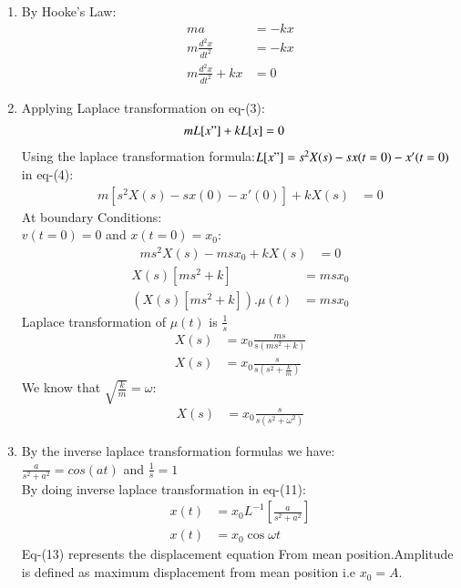\documentclass[journal,12pt,twocolumn]{IEEEtran}
\theoremstyle{remark}
\begin{document}
\begin{enumerate}
\\
\item{}
By Hooke's Law:
\begin{align}
    ma&=-kx\\
    m\frac{d^2x}{dt^2}&=-kx\\
    m\frac{d^2x}{dt^2}+kx&=0
\end{align}
\item{}
 Applying Laplace transformation on eq-(3):
\begin{align}
    mL[x"]+kL[x]&=0
    \end{align}
 Using the laplace transformation formula:$L[x"]=s^2X(s)-sx(t=0)-x'(t=0)$ in eq-(4):
 \begin{align}
m[s^2X(s)-sx(0)-x'(0)]+kX(s)&=0
\end{align}
At boundary Conditions:\\$v(t=0)=0$  and $x(t=0)=x_0$:
\begin{align}
  ms^2X(s)-msx_0+kX(s)&=0
  \end{align}
  \begin{align}
  X(s)[ms^2+k]&=msx_0\\
   (X(s)[ms^2+k]).\mu{(t)}&=msx_0
   \end{align}
   Laplace transformation of $\mu{(t)}$ is $\frac{1}{s}$
   \begin{align}
  X(s)&=x_0\frac{ms}{s(ms^2+k)}\\
  X(s)&=x_0\frac{s}{s(s^2+\frac{k}{m})}
\end{align}
We know that $\sqrt{\frac{k}{m}}=\omega$:
\begin{align}
X(s)&=x_0\frac{s}{s(s^2+\omega^2)}
\end{align}
\item{}
By the inverse laplace transformation formulas we have:\\
$\frac{a}{s^2+a^2}=cos(at)$ and $\frac{1}{s}=1$\\
By doing inverse laplace transformation in eq-(11):
\begin{align}
    x(t)&=x_0L^{-1}\left[\frac{a}{s^2+a^2}\right]\\
    x(t)&=x_0\cos{\omega{t}}
\end{align}
Eq-(13) represents the displacement equation From mean position.Amplitude is defined as maximum displacement from mean position i.e $x_0=A$.\\

\end{enumerate}
\end{document}
